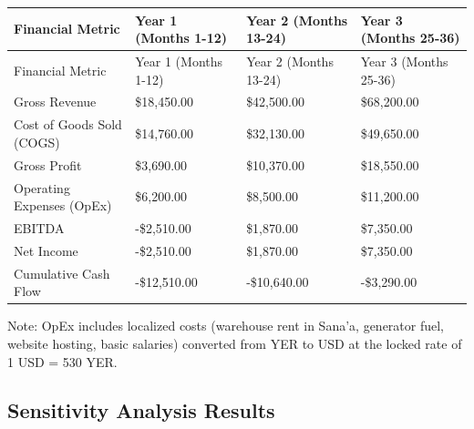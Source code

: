 \documentclass[12pt,a4paper]{article}
\begin{document}
\begin{longtable}{|>{\RaggedRight\arraybackslash}p{}|>{\RaggedRight\arraybackslash}p{}|>{\RaggedRight\arraybackslash}p{}|>{\RaggedRight\arraybackslash}p{}|}

\hline

Financial Metric & Year 1 (Months 1-12) & Year 2 (Months 13-24) & Year 3 (Months 25-36) \\

\hline

\endfirsthead

\hline

Financial Metric & Year 1 (Months 1-12) & Year 2 (Months 13-24) & Year 3 (Months 25-36) \\

\hline

\endhead

Gross Revenue & \$18,450.00 & \$42,500.00 & \$68,200.00 \\

\hline

Cost of Goods Sold (COGS) & \$14,760.00 & \$32,130.00 & \$49,650.00 \\

\hline

Gross Profit & \$3,690.00 & \$10,370.00 & \$18,550.00 \\

\hline

Operating Expenses (OpEx) & \$6,200.00 & \$8,500.00 & \$11,200.00 \\

\hline

EBITDA & -\$2,510.00 & \$1,870.00 & \$7,350.00 \\

\hline

Net Income & -\$2,510.00 & \$1,870.00 & \$7,350.00 \\

\hline

Cumulative Cash Flow & -\$12,510.00 & -\$10,640.00 & -\$3,290.00 \\

\hline

\end{longtable}

Note: OpEx includes localized costs (warehouse rent in Sana'a, generator fuel, website hosting, basic salaries) converted from YER to USD at the locked rate of 1 USD = 530 YER.

\subsection{Sensitivity Analysis Results}
\end{document}
